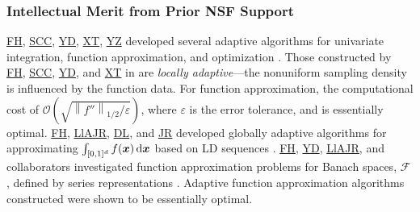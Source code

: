 \documentclass[11pt]{NSFamsart}
\newcommand{\FH}{\hyperlink{FHlink}{FH}\xspace}
\newcommand{\SCTC}{\hyperlink{SCTClink}{SCC}\xspace}
\newcommand{\YD}{\hyperlink{YDlink}{YD}\xspace}
\newcommand{\JR}{\hyperlink{JRlink}{JR}\xspace}
\newcommand{\LlAJR}{\hyperlink{LlAJRlink}{LlAJR}\xspace}
\newcommand{\XT}{\hyperlink{XTlink}{XT}\xspace}
\newcommand{\DL}{\hyperlink{DLlink}{DL}\xspace}
\newcommand{\YZ}{\hyperlink{YZlink}{YZ}\xspace}
\newcommand{\bx}{{\boldsymbol{x}}}
\def\dif{\textup{d}}
\newcommand{\calf}{{\mathcal{F}}}
\def\abs#1{\ensuremath{\left \lvert #1 \right \rvert}}
\newcommand{\norm}[2][{}]{\ensuremath{\left \lVert #2 \right \rVert}_{#1}}
\newcommand{\Order}{\mathcal{O}}
\begin{document}
\subsubsection{Intellectual Merit from Prior NSF Support}
\label{previousmeritsubsec}

\FH, \SCTC, \YD, \XT, \YZ developed several adaptive algorithms for univariate integration, function approximation, and optimization \cite{ChoEtal17a,HicEtal14b,  Din15a, Ton14a, Zha18a}.  Those constructed by \FH, \SCTC, \YD, and \XT in \cite{ChoEtal17a} are \emph{locally adaptive}---the nonuniform sampling density is influenced by the function data.  For function approximation, the computational cost of $\Order\left(\sqrt{\norm[1/2]{f''}/\varepsilon} \right)$, where $\varepsilon$ is the error tolerance, and is essentially optimal. 
\FH, \LlAJR, \DL, and \JR developed globally adaptive algorithms for approximating $\int_{[0,1]^d} f(\bx) \, \dif \bx$ based on LD sequences \cite{HicJim16a,HicEtal17a,JimHic16a}. 
\FH, \YD, \LlAJR, and collaborators investigated function approximation problems for Banach spaces, $\calf$, defined by series representations \cite{DinHic20a,DinEtal20a}.  Adaptive function approximation algorithms constructed were shown to be essentially optimal.


\end{document}

